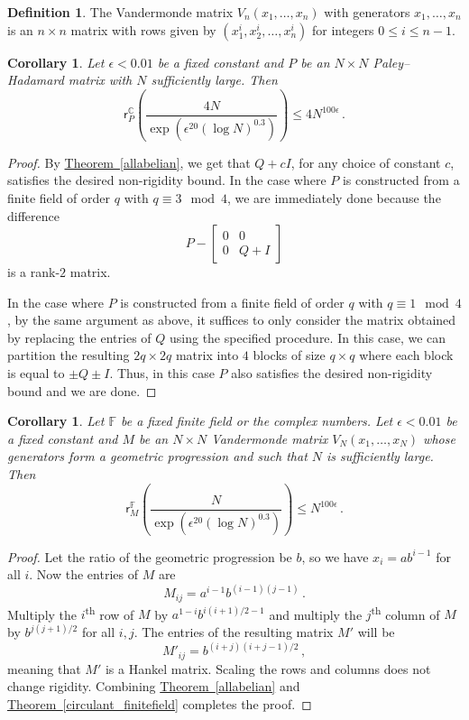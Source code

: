 \documentclass[11pt]{article}
\numberwithin{equation}{section}
\newtheorem{corollary}[theorem]{Corollary}
\theoremstyle{definition}
\newtheorem{definition}[theorem]{Definition}
\theoremstyle{plain}
\newcommand{\C}{\mathbb C}
\newcommand{\expref}[2]{\hyperref[#2]{#1~\ref{#2}}}
\theoremstyle{definition}
\newcommand\F{{\mathbb{F}}}
\renewcommand\C{{\mathbb{C}}}
\newcommand{\ts}{\textsuperscript}
\begin{document}
{\begin{definition}
The Vandermonde matrix $V_n(x_1, \dots , x_n)$ with generators $x_1, \dots , x_n$ is an $n \times n$ matrix with rows given by $(x_1^i, x_2^i, \dots , x_n^i)$ for integers $0 \leq i \leq n-1$.
\end{definition}


\begin{corollary}  \label{cor:kivva1}
Let $\epsilon < 0.01$ be a fixed constant and $P$ be an $N \times N$ Paley--Hadamard matrix with $N$ sufficiently large.  Then
\[
\textsf{r}_P^{\C}\left( \frac{4N}{\exp\left(\epsilon^{20}(\log N)^{0.3}\right)}\right) \leq 4N^{100 \epsilon} \,.
\]
\end{corollary}
\begin{proof}
By \expref{Theorem}{allabelian}, we get that $Q + cI$, for any choice of constant $c$, satisfies the desired non-rigidity bound.  In the case where $P$ is constructed from a finite field of order $q$ with $q \equiv 3 \mod 4$, we are immediately done because the difference
\[
P - \begin{bmatrix}0 & 0 \\ 0 & Q + I \end{bmatrix}
\]
is a rank-$2$ matrix.  %

In the case where $P$ is constructed from a finite field of order $q$ with $q \equiv 1 \mod 4$, by the same argument as above, it suffices to only consider the matrix obtained by replacing the entries of $Q$ using the specified procedure.  In this case, we can partition the resulting $2q \times 2q$ matrix into $4$ blocks of size $q \times q$ where each block is equal to $\pm Q \pm I$.  Thus, in this case $P$ also satisfies the desired non-rigidity bound and we are done.
\end{proof}

\begin{corollary}    \label{cor:kivva2}
Let $\F$ be a fixed finite field or the complex numbers.  Let $\epsilon < 0.01$ be a fixed constant and $M$ be an $N \times N$ Vandermonde matrix $V_N(x_1, \dots, x_N)$ whose generators form a geometric progression and such that $N$ is sufficiently large.  Then
\[
\textsf{r}_M^{\F}\left( \frac{N}{\exp\left(\epsilon^{20}(\log N)^{0.3}\right)}\right) \leq N^{100 \epsilon} \,.
\]
\end{corollary}
\begin{proof}
Let the ratio of the geometric progression be $b$,
%
%
so we have   %
$x_i = ab^{i-1}$ for all $i$.  Now the entries of $M$ are
\[
M_{ij} = a^{i-1}b^{(i-1)(j-1)} \,.
\]  
Multiply  
the $i$\ts{th} row of $M$ by $a^{1 - i}b^{i(i+1)/2 - 1}$ and
%
multiply   %
the $j$\ts{th} column of $M$ by $b^{j(j+1)/2}$ for all $i,j$.
The entries of the resulting matrix $M'$ will be
\[
M'_{ij} = b^{(i+j)(i+j-1)/2} \,,
\]
meaning that $M'$ is a Hankel matrix.
Scaling the rows and columns does not change rigidity.  %
Combining \expref{Theorem}{allabelian} and 
\expref{Theorem}{circulant_finitefield} completes the proof.
\end{proof}
%
}  %
\end{document}
